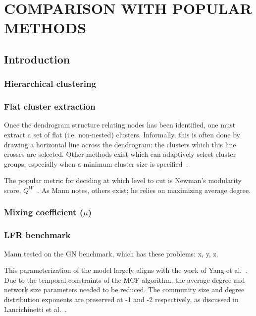 \chapter{COMPARISON WITH POPULAR METHODS} \label{ch:comparison}%

\section{Introduction} \label{sec:comparison introduction}

\subsection{Hierarchical clustering}\label{sec:Hierarchical Clustering}

\subsection{Flat cluster extraction}\label{sec:Flat Cluster Extraction}

Once the dendrogram structure relating nodes has been identified, one must extract a set of flat (i.e. non-nested) clusters. Informally, this is often done by drawing a horizontal line across the dendrogram: the clusters which this line crosses are selected. Other methods exist which can adaptively select cluster groups, especially when a minimum cluster size is specified~\cite{campello2013density}.

The popular metric for deciding at which level to cut is Newman's modularity score, $Q^W$~\cite{newman2006modularity}. As Mann notes, others exist; he relies on maximizing average degree. 

\subsection{Mixing coefficient ($\mu$)}

\subsection{LFR benchmark} \label{sec:LFR Benchmark} %

Mann tested on the GN benchmark, which has these problems: x, y, z.

This parameterization of the model largely aligns with the work of Yang et al.~\cite{yang2016comparative}. Due to the temporal constraints of the MCF algorithm, the average degree and network size parameters needed to be reduced. The community size and degree distribution exponents are preserved at -1 and -2 respectively, as discussed in Lancichinetti et al.~\cite{lancichinetti2008benchmark}.

